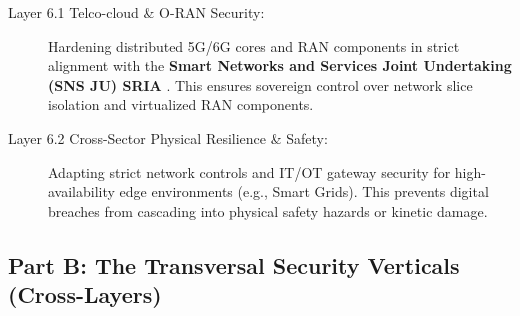 \documentclass[12pt,a4paper]{report}
\begin{document}
\begin{description}
\item[Layer 6.1 Telco-cloud \& O-RAN Security:] Hardening distributed 5G/6G cores and RAN components in strict alignment with the \textbf{Smart Networks and Services Joint Undertaking (SNS JU) SRIA} \cite{snsju}. This ensures sovereign control over network slice isolation and virtualized RAN components.

\item[Layer 6.2 Cross-Sector Physical Resilience \& Safety:] Adapting strict network controls and IT/OT gateway security for high-availability edge environments (e.g., Smart Grids). This prevents digital breaches from cascading into physical safety hazards or kinetic damage.

\end{description}

\subsection*{Part B: The Transversal Security Verticals (Cross-Layers)}
\end{document}
